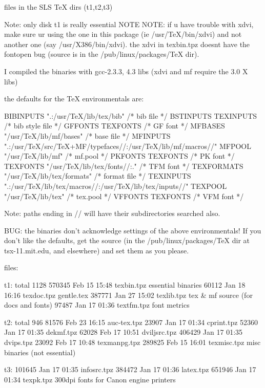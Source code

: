 files in the SLS TeX dirs (t1,t2,t3)   

Note:   only disk t1 is really essential 
 NOTE NOTE: if u have trouble with xdvi, make sure ur using
the one in this package (ie /usr/TeX/bin/xdvi) and not another
one (say /usr/X386/bin/xdvi). the xdvi in texbin.tpz doesnt 
have the fontopen bug (source is in the /pub/linux/packages/TeX dir).


 I compiled the binaries with gcc-2.3.3, 4.3 libs (xdvi and 
     mf require the 3.0 X libs)

the defaults for the TeX environmentals are:

BIBINPUTS  ".:/usr/TeX/lib/tex/bib"		/* bib file */
BSTINPUTS  TEXINPUTS				/* bib style file */
GFFONTS    TEXFONTS				/* GF font */
MFBASES    "/usr/TeX/lib/mf/bases"		/* base file */
MFINPUTS ".:/usr/TeX/src/TeX+MF/typefaces//:/usr/TeX/lib/mf/macros//"
MFPOOL     "/usr/TeX/lib/mf"			/* mf.pool */
PKFONTS    TEXFONTS				/* PK font */
TEXFONTS   "/usr/TeX/lib/tex/fonts//:."	/* TFM font */
TEXFORMATS "/usr/TeX/lib/tex/formats"		/* format file */
TEXINPUTS  ".:/usr/TeX/lib/tex/macros//:/usr/TeX/lib/tex/inputs//"
TEXPOOL    "/usr/TeX/lib/tex"			/* tex.pool */
VFFONTS	   TEXFONTS				/* VFM font */

Note: paths ending in // will have their subdirectories searched also.
      
BUG: the binaries don't acknowledge settings of the above
environmentals! If you don't like the defaults, get the source (in the
/pub/linux/packages/TeX dir at tsx-11.mit.edu, and elsewhere) and set
them as you please. 


files:

t1:
total 1128
    570345 Feb 15 15:48 texbin.tpz  essential binaries                  
     60112 Jan 18 16:16 texdoc.tpz  gentle.tex                          
    387771 Jan 27 15:02 texlib.tpz  tex & mf source (for docs and fonts)
     97487 Jan 17 01:36 textfm.tpz  font metrics                        

t2:
total 946
     81576 Feb 23 16:15 auc-tex.tpz
     23907 Jan 17 01:34 cprint.tpz
     52360 Jan 17 01:35 dekmf.tpz
     62028 Feb 17 10:51 dviljsrc.tpz
    406429 Jan 17 01:35 dvips.tpz
     23092 Feb 17 10:48 texmanpg.tpz
    289825 Feb 15 16:01 texmisc.tpz   misc binaries (not essential)

t3:
    101645 Jan 17 01:35 infosrc.tpz
    384472 Jan 17 01:36 latex.tpz
    651946 Jan 17 01:34 texpk.tpz    300dpi fonts for Canon engine printers
                                             
